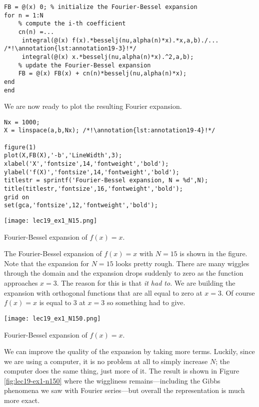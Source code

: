 \begin{enumerate}
\begin{lstlisting}[name=lec19_ex,style=myMatlab]
FB = @(x) 0; % initialize the Fourier-Bessel expansion
for n = 1:N
    % compute the i-th coefficient
    cn(n) =...
     integral(@(x) f(x).*besselj(nu,alpha(n)*x).*x,a,b)./... /*!\annotation{lst:annotation19-3}!*/
     integral(@(x) x.*besselj(nu,alpha(n)*x).^2,a,b);
    % update the Fourier-Bessel expansion
    FB = @(x) FB(x) + cn(n)*besselj(nu,alpha(n)*x); 
end
end
\end{lstlisting}
\end{enumerate}
We are now ready to plot the resulting Fourier expansion.

\begin{lstlisting}[name=lec19_ex,style=myMatlab]
Nx = 1000;
X = linspace(a,b,Nx); /*!\annotation{lst:annotation19-4}!*/

figure(1)
plot(X,FB(X),'-b','LineWidth',3);
xlabel('X','fontsize',14,'fontweight','bold');
ylabel('f(X)','fontsize',14,'fontweight','bold');
titlestr = sprintf('Fourier-Bessel expansion, N = %d',N);
title(titlestr,'fontsize',16,'fontweight','bold');
grid on
set(gca,'fontsize',12,'fontweight','bold');

\end{lstlisting}
\begin{marginfigure}
\texttt{[image: lec19\_ex1\_N15.png]}
\caption{Fourier-Bessel expansion of $f(x)=x$.}
\end{marginfigure}
The Fourier-Bessel expansion of $f(x)=x$ with $N=15$ is shown in the figure.  Note that the expansion for $N=15$ looks pretty rough. There are many wiggles through the domain and the expansion drops suddenly to zero as the function approaches $x=3$.  The reason for this is that \emph{it had to.}  We are building the expansion with orthogonal functions that are all equal to zero at $x=3$.  Of course $f(x)=x$ is equal to 3 at $x=3$ so something had to give.  

\begin{marginfigure}
\texttt{[image: lec19\_ex1\_N150.png]}
\caption{Fourier-Bessel expansion of $f(x)=x$.}
\label{fig:lec19-ex1-n150}
\end{marginfigure}
We can improve the quality of the expansion by taking more terms.  Luckily, since we are using a computer, it is no problem at all to simply increase $N$; the computer does the same thing, just more of it.  The result is shown in Figure \ref{fig:lec19-ex1-n150} where the wiggliness remains---including the Gibbs phenomena we saw with Fourier series---but overall the representation is much more exact.

